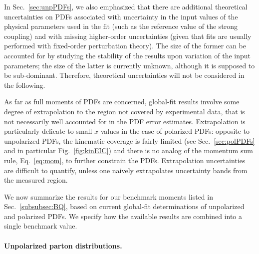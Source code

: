 In Sec.~\ref{sec:unpPDFs}, we also emphasized that there are additional 
theoretical uncertainties on PDFs associated with uncertainty in
the input values of the physical parameters used in the fit (such as the 
reference value of the strong coupling) and with missing higher-order
uncertainties (given that fits are usually performed with fixed-order
perturbation theory).
%
The size of the former can be accounted for by studying the stability of the 
results upon variation of the input parameters; the size of the latter is
currently unknown, although it is supposed to be sub-dominant.
%
Therefore, theoretical uncertainties will not be considered in the following.

As far as full moments of PDFs are concerned, global-fit results involve
some degree of extrapolation to the region not covered by experimental data, 
that is not necessarily well accounted for in the PDF error estimates.
%
Extrapolation is particularly delicate to small $x$ values in the case of 
polarized PDFs: opposite to unpolarized PDFs, the kinematic coverage is 
fairly limited (see Sec.~\ref{sec:polPDFs} and in particular 
Fig.~\ref{fig:kinEIC}) and there is no analog of the momentum sum rule,
Eq.~\eqref{eq:mom}, to further constrain the PDFs.
%
Extrapolation uncertainties are difficult to quantify, unless
one naively extrapolates uncertainty bands from the measured region.

We now summarize the results for our benchmark moments listed in 
Sec.~\ref{subsubsec:BQ}, based on current global-fit determinations of
unpolarized and polarized PDFs.
%
We specify how the
available results are combined into a single benchmark value.

\paragraph{Unpolarized parton distributions.}

